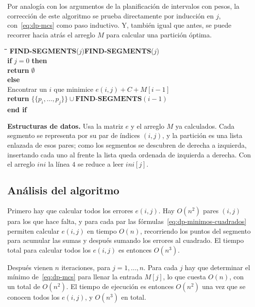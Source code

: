 \documentclass[12pt, spanish, oneside, openany]{book}
\newcommand{\pl}[1]{\makebox[1.6em][r]{\texttt{\footnotesize #1}}\hspace{0.9em}}
\newenvironment{pseudo}[1]{%
  \begin{center}%
  \begin{mdframed}[style=pseudobox]%
  \small
  \begin{tabbing}%
  \hspace{2.5em}\=\hspace{1.5em}\=\hspace{1.5em}\=\hspace{1.5em}\=\hspace{1.5em}\=\kill
  \def\pseudotitulo{#1}\ifx\pseudotitulo\empty\else#1\\[3pt]\fi}%
  {\end{tabbing}\end{mdframed}\end{center}}
\newenvironment{estructuras}%
  {\begin{center}\begin{minipage}{0.93\textwidth}\begin{mdframed}[style=estrbox]%
   \small\textbf{Estructuras de datos.}\;}%
  {\end{mdframed}\end{minipage}\end{center}}
\theoremstyle{uprightplain}
\theoremstyle{definition}
\theoremstyle{remark}
\theoremstyle{definition}
\begin{document}
Por analogía con los argumentos de la planificación de intervalos con pesos, la corrección de este algoritmo se prueba directamente por inducción en $j$, con~\eqref{eq:dp-mcs} como paso inductivo. Y, también igual que antes, se puede recorrer hacia atrás el arreglo $M$ para calcular una partición óptima.

\begin{pseudo}{\textbf{FIND-SEGMENTS}($j$)}
\pl{1}\> \textbf{if} $j = 0$ \textbf{then}\\
\pl{2}\>\> \textbf{return} $\emptyset$\\
\pl{3}\> \textbf{else}\\
\pl{4}\>\> Encontrar un $i$ que minimice $e(i,j)+C+M[i-1]$\\
\pl{5}\>\> \textbf{return} $\bigl\{\{p_i,\dots,p_j\}\bigr\}\cup\textbf{FIND-SEGMENTS}(i-1)$\\
\pl{6}\> \textbf{end if}
\end{pseudo}

\begin{estructuras}
Usa la matriz $e$ y el arreglo $M$ ya calculados. Cada segmento se representa
por su par de índices $(i,j)$, y la partición es una lista enlazada de esos
pares; como los segmentos se descubren de derecha a izquierda, insertando cada
uno al frente la lista queda ordenada de izquierda a derecha. Con el arreglo
$\mathit{ini}$ la línea $4$ se reduce a leer $\mathit{ini}[j]$.
\end{estructuras}

\subsection{Análisis del algoritmo}

Primero hay que calcular todos los errores $e(i,j)$. Hay $O(n^2)$ pares $(i,j)$ para los que hace falta, y para cada par las fórmulas~\eqref{eq:dp-minimos-cuadrados} permiten calcular $e(i,j)$ en tiempo $O(n)$, recorriendo los puntos del segmento para acumular las sumas y después sumando los errores al cuadrado. El tiempo total para calcular todos los $e(i,j)$ es entonces $O(n^3)$.

Después vienen $n$ iteraciones, para $j=1,\dots,n$. Para cada $j$ hay que determinar el mínimo de~\eqref{eq:dp-mcs} para llenar la entrada $M[j]$, lo que cuesta $O(n)$, con un total de $O(n^2)$. El tiempo de ejecución es entonces $O(n^2)$ una vez que se conocen todos los $e(i,j)$, y $O(n^3)$ en total.
\end{document}

